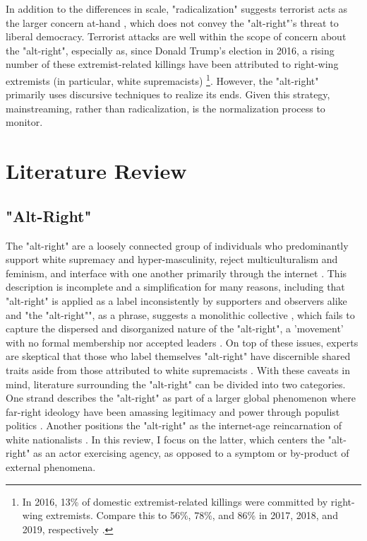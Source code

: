 \documentclass[acmlarge, screen, authorversion]{acmart}
\begin{document}
In addition to the differences in scale, "radicalization" suggests terrorist acts as the larger concern at-hand \cite{torokDevelopingExplanatoryModel2013}, which does not convey the "alt-right"'s threat to liberal democracy. Terrorist attacks are well within the scope of concern about the "alt-right", especially as, since Donald
Trump’s election in 2016, a rising number of these extremist-related
killings have been attributed to right-wing extremists (in particular,
white supremacists) \cite{greenblattRightWingExtremistViolence}
\footnote{In 2016, 13\% of domestic extremist-related killings were committed by right-wing extremists. Compare this to 56\%, 78\%, and 86\% in 2017, 2018, and 2019, respectively \cite{greenblattRightWingExtremistViolence}.}. 
However, the "alt-right" primarily uses discursive techniques to realize its ends. Given this strategy, mainstreaming, rather than radicalization, is the normalization process to monitor.

\section{Literature Review}

\subsection{"Alt-Right"}

The "alt-right" are a loosely connected group of individuals who predominantly support white supremacy and hyper-masculinity, reject multiculturalism and feminism, and interface with one another primarily through the internet
\cite{sternProudBoysWhite2019, mainRiseAltRight2018, nagleKillAllNormies2017, hawleyMakingSenseAltright2017}.
This description is incomplete and a simplification for
many reasons, including that "alt-right" is applied as a label inconsistently
by supporters and observers alike \cite{hawleyMakingSenseAltright2017} and
"the "alt-right"", as a phrase, suggests a monolithic collective
\cite{massanariRethinkingResearchEthics2018}, which fails to capture the
dispersed and disorganized \cite{martinDissectingTrumpMost2017} nature of the
"alt-right", a 'movement' with no formal membership nor accepted leaders
\cite{hawleyMakingSenseAltright2017}. On top of these issues, experts are
skeptical that those who label themselves "alt-right" have discernible shared
traits aside from those attributed to white supremacists
\cite{gallaherMainstreamingWhiteSupremacy2020,
johndaniszewskiWritingAltright2016}.  With these caveats in mind, literature
surrounding the "alt-right" can be divided into two categories. One strand
describes the "alt-right" as part
of a larger global phenomenon where far-right ideology have been
amassing legitimacy and power through populist politics
\cite{cammaertsMainstreamingExtremeRightWing2018,
worthMorbidSymptomsGlobal2019}. Another positions the
"alt-right" as the internet-age reincarnation of white nationalists
\cite{hawleyMakingSenseAltright2017, mainRiseAltRight2018}. In this review,
I focus on the latter, which centers the "alt-right" as an actor exercising agency, as opposed to a symptom or by-product of external phenomena.
\end{document}
